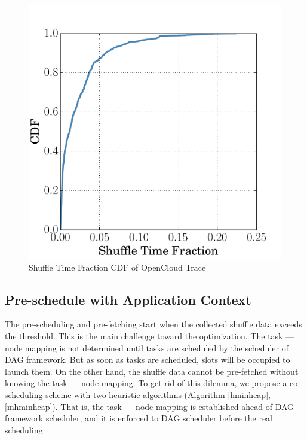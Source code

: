 \begin{figure}
	\centering
	\includegraphics[width=0.6\linewidth]{fig/reduce_cdf}
	\caption{Shuffle Time Fraction CDF of OpenCloud Trace}
	\label{fig:cdf}
\end{figure}
\subsection{Pre-schedule with Application Context}
The pre-scheduling and pre-fetching start when the collected shuffle data exceeds the threshold.
This is the main challenge toward the optimization. The task --- node mapping is not determined until tasks are scheduled by the scheduler of DAG framework. But as soon as tasks are scheduled, slots will be occupied to launch them. On the other hand, the shuffle data cannot be pre-fetched without knowing the task --- node mapping.
To get rid of this dilemma, we propose a co-scheduling scheme with two heuristic algorithms (Algorithm \ref{hminheap}, \ref{mhminheap}). That is, the task --- node mapping is established ahead of DAG framework scheduler, and it is enforced to DAG scheduler before the real scheduling.

